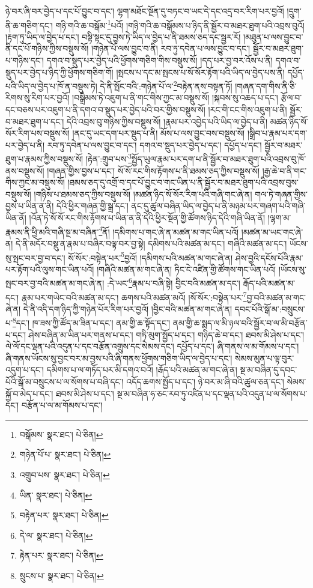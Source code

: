 ཉེ་བར་ཞི་བར་བྱེད་པ་དང་པོ་བྱུང་བ་དང་། ལྷག་མཐོང་སྔོན་དུ་བཏང་བ་ཡང་དེ་དང་འདྲ་བར་རིག་པར་བྱའོ། །དྲུག་ནི་ཆ་གཅིག་དང་། གཉི་གའི་ཆ་བསྒོམ་\footnote{བསྒོམས་  སྣར་ཐང་།  པེ་ཅིན། }པའོ། །གཉི་གའི་ཆ་བསྒོམས་པ་ཉིད་ནི་སྦྱོར་བ་མཐར་ཐུག་པའི་འབྲས་བུའོ། །རྟག་ཏུ་ཡིད་ལ་བྱེད་པ་དང་། བསྟི་སྟང་དུ་བྱས་ཏེ་ཡིད་ལ་བྱེད་པ་ནི་ཐམས་ཅད་དང་སྦྱར་རོ། །མཐུན་པ་ལས་བྱུང་བ་ནི་དང་པོ་གཉིས་ཀྱིས་བསྡུས་སོ། །གཉེན་པོ་ལས་བྱུང་བ་ནི། རབ་ཏུ་དབེན་པ་ལས་བྱུང་བ་དང་། སྦྱོར་བ་མཐར་ཐུག་པ་གཉིས་དང་། དགའ་བ་སྡུད་པར་བྱེད་པའི་ཕྱོགས་གཅིག་གིས་བསྡུས་སོ། །དད་པར་བྱ་བར་འོས་པ་ནི། དགའ་བ་སྡུད་པར་བྱེད་པ་ཉིད་ཀྱི་ཕྱོགས་གཅིག་གོ། །སྤངས་པ་དང་མ་སྤངས་པ་སོ་སོར་རྟོག་པའི་ཡིད་ལ་བྱེད་པས་ནི། དཔྱོད་པའི་ཡིད་ལ་བྱེད་པ་ཁོ་ན་བསྡུས་ཏེ། དེ་ནི་སྤོང་བའི་:གཉེན་པོ་ལ་\footnote{གཉེན་པོ་པ་  སྣར་ཐང་།  པེ་ཅིན། }བརྟེན་ནས་བསྟན་ཏོ། །གཞན་དག་གིས་ནི་ཅི་རིགས་སུ་རིག་པར་བྱའོ། །བསྒྲིམས་ཏེ་འཇུག་པ་ནི་གང་གིས་ཀྱང་མ་བསྡུས་སོ། །སྐབས་སུ་འཆད་པ་དང་། རྩོལ་བ་དང་བཅས་པར་འཇུག་པ་ནི་དགའ་བ་སྡུད་པར་བྱེད་པའི་བར་གྱིས་བསྡུས་སོ། །རང་གི་ངང་གིས་འཇུག་པ་ནི། སྦྱོར་བ་མཐར་ཐུག་པ་དང་། དེའི་འབྲས་བུ་གཉིས་ཀྱིས་བསྡུས་སོ། །རྣམ་པར་འབྱེད་པའི་ཡིད་ལ་བྱེད་པ་ནི། མཚན་ཉིད་སོ་སོར་རིག་པས་བསྡུས་སོ། །ནང་དུ་ཡང་དག་པར་སྡུད་པ་ནི། མོས་པ་ལས་བྱུང་བས་བསྡུས་སོ། །སྒྲིབ་པ་རྣམ་པར་དག་པར་བྱེད་པ་ནི། རབ་ཏུ་དབེན་པ་ལས་བྱུང་བ་དང་། དགའ་བ་སྡུད་པར་བྱེད་པ་དང་། དཔྱོད་པ་དང་། སྦྱོར་བ་མཐར་ཐུག་པ་རྣམས་ཀྱིས་བསྡུས་སོ། །རྟེན་:གྲུབ་པས་\footnote{འགྲུབ་པས་  སྣར་ཐང་།  པེ་ཅིན། }སྤྱོད་ཡུལ་རྣམ་པར་དག་པ་ནི་སྦྱོར་བ་མཐར་ཐུག་པའི་འབྲས་བུ་ཁོ་ནས་བསྡུས་སོ། །གཞན་གྱིས་བྱས་པ་དང་། སོ་སོ་རང་གིས་རྟོགས་པ་ནི་ཐམས་ཅད་ཀྱིས་བསྡུས་སོ། །རྒྱ་ཆེ་བ་ནི་གང་གིས་ཀྱང་མ་བསྡུས་སོ། །ཐམས་ཅད་དུ་འགྲོ་བ་དང་པོ་བྱུང་བ་གང་ཡིན་པ་ནི་སྦྱོར་བ་མཐར་ཐུག་པའི་འབྲས་བུས་བསྡུས་སོ། །གཉིས་པ་ཐམས་ཅད་ཀྱིས་བསྡུས་སོ། །མཚན་ཉིད་སོ་སོར་རིག་པའི་གཞི་གང་ཞེ་ན། གལ་ཏེ་གཞན་གྱིས་བྱས་པ་ཡིན་ན་ནི། དེའི་ཕྱིར་གཞན་གྱི་སྒྲ་དང་། ནང་དུ་ཚུལ་བཞིན་ཡིད་ལ་བྱེད་པ་ནི་མཉམ་པར་གཞག་པའི་གཞི་ཡིན་ནོ། །འོན་ཏེ་སོ་སོ་རང་གིས་རྟོགས་པ་ཡིན་ན་ནི་དེའི་ཕྱིར་སྔོན་གྱི་ཚོགས་ཉིད་དེའི་གཞི་ཡིན་ནོ། །ལྷག་མ་རྣམས་ནི་ཕྱི་མའི་གཞི་སྔ་མ་བཞིན་\footnote{ཡིན་  སྣར་ཐང་།  པེ་ཅིན། }ནོ། །དམིགས་པ་གང་ཞེ་ན་མཚན་མ་གང་ཡིན་པའོ། །མཚན་མ་ཡང་གང་ཞེ་ན། དེ་ནི་མདོར་བསྡུ་ན་རྣམ་པ་བཞིར་བལྟ་བར་བྱ་སྟེ། དམིགས་པའི་མཚན་མ་དང་། གཞིའི་མཚན་མ་དང་། ཡོངས་སུ་སྤང་བར་བྱ་བ་དང་། སོ་སོར་:བསྟེན་པར་\footnote{བརྟེན་པར་  སྣར་ཐང་།  པེ་ཅིན། }བྱའོ། །དམིགས་པའི་མཚན་མ་གང་ཞེ་ན། ཤེས་བྱའི་དངོས་པོའི་རྣམ་པར་རྟོག་པའི་ལུས་གང་ཡིན་པའོ། །གཞིའི་མཚན་མ་གང་ཞེ་ན། ཏིང་ངེ་འཛིན་གྱི་ཚོགས་གང་ཡིན་པའོ། །ཡོངས་སུ་སྤང་བར་བྱ་བའི་མཚན་མ་གང་ཞེ་ན། :དེ་ཡང་\footnote{དེ་ལ་  སྣར་ཐང་།  པེ་ཅིན། }རྣམ་པ་བཞི་སྟེ། བྱིང་བའི་མཚན་མ་དང་། རྒོད་པའི་མཚན་མ་དང་། རྣམ་པར་གཡེང་བའི་མཚན་མ་དང་། ཆགས་པའི་མཚན་མའོ། །སོ་སོར་:བསྟེན་པར་\footnote{རྟེན་པར་  སྣར་ཐང་།  པེ་ཅིན། }བྱ་བའི་མཚན་མ་གང་ཞེ་ན། དེ་ནི་འདི་དག་ཉིད་ཀྱི་གཉེན་པོར་རིག་པར་བྱའོ། །བྱིང་བའི་མཚན་མ་གང་ཞེ་ན། དབང་པོའི་སྒོ་མ་:བསྲུངས་པ་\footnote{སྲུངས་པ་  སྣར་ཐང་།  པེ་ཅིན། }དང་། ཁ་ཟས་ཀྱི་ཚོད་མ་ཟིན་པ་དང་། ནམ་གྱི་ཆ་སྟོད་དང་། ནམ་གྱི་ཆ་སྨད་ལ་མི་ཉལ་བའི་སྦྱོར་བ་ལ་མི་བརྩོན་པ་དང་། ཤེས་བཞིན་མ་ཡིན་པར་གནས་པ་དང་། གཏི་མུག་སྤྱོད་པ་དང་། གཉིད་ཆེ་བ་དང་། ཐབས་མི་ཤེས་པ་དང་། ལེ་ལོ་དང་ལྡན་པའི་འདུན་པ་དང་བརྩོན་འགྲུས་དང་སེམས་དང་། དཔྱོད་པ་དང་། ཞི་གནས་ལ་མ་གོམས་པ་དང་། ཞི་གནས་ཡོངས་སུ་བྱང་བར་མ་བྱས་པའི་ཞི་གནས་ཕྱོགས་གཅིག་ཡིད་ལ་བྱེད་པ་དང་། སེམས་མུན་པ་ལྟ་བུར་འདུག་པ་དང་། དམིགས་པ་ལ་གཏོད་པར་མི་དགའ་བའོ། །རྒོད་པའི་མཚན་མ་གང་ཞེ་ན། སྔ་མ་བཞིན་དུ་དབང་པོའི་སྒོ་མ་བསྲུངས་པ་ལ་སོགས་པ་བཞི་དང་། འདོད་ཆགས་སྤྱོད་པ་དང་། ཉེ་བར་མ་ཞི་བའི་ཚུལ་ཅན་དང་། སེམས་སྐྱོ་བ་མེད་པ་དང་། ཐབས་མི་ཤེས་པ་དང་། སྔ་མ་བཞིན་ཧ་ཅང་རབ་ཏུ་འཛིན་པ་དང་ལྡན་པའི་འདུན་པ་ལ་སོགས་པ་དང་། བརྩོན་པ་ལ་མ་གོམས་པ་དང་། 